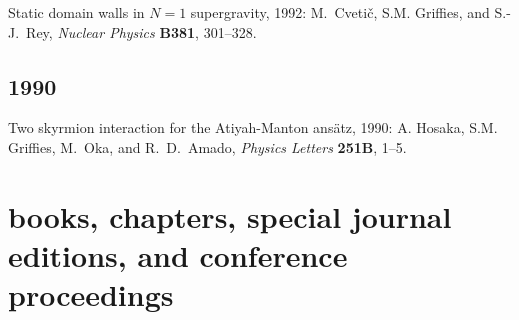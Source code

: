 \begin{etaremune}
\item Static domain walls in $N=1$ supergravity, 1992: M.\ Cveti\v c, S.M. Grif\/f\/ies, and S.-J.\ Rey, {\em Nuclear Physics} {\bf B381}, 301--328.

\subsection*{\sc \color{Maroon} 1990}

\item Two skyrmion interaction for the Atiyah-Manton ans\"atz, 1990:  A. Hosaka, S.M. Grif\/f\/ies, M.\ Oka, and R.\ D.\ Amado, {\it Physics Letters} {\bf 251B}, 1--5.


\end{etaremune}

\section*{\sc \color{Maroon} books, chapters, special journal editions, and conference proceedings}


